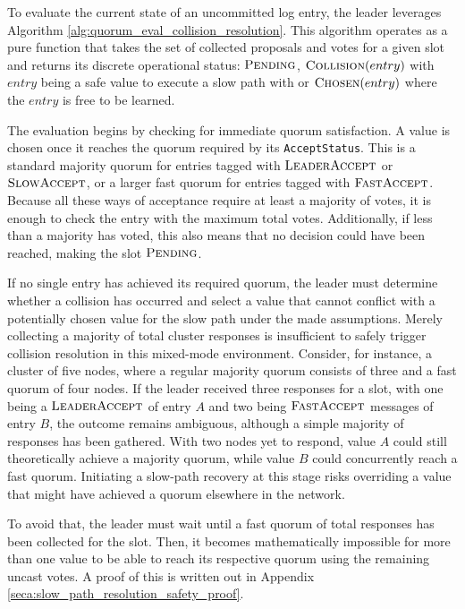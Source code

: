To evaluate the current state of an uncommitted log entry, the leader leverages Algorithm \ref{alg:quorum_eval_collision_resolution}. This algorithm operates as a pure function that takes the set of collected proposals and votes for a given slot and returns its discrete operational status: $\textsc{Pending}$, $\textsc{Collision}(entry)$ with $entry$ being a safe value to execute a slow path with or $\textsc{Chosen}(entry)$ where the $entry$ is free to be learned.

The evaluation begins by checking for immediate quorum satisfaction. A value is chosen once it reaches the quorum required by its \texttt{AcceptStatus}. This is a standard majority quorum for entries tagged with $\textsc{LeaderAccept}$ or $\textsc{SlowAccept}$, or a larger fast quorum for entries tagged with $\textsc{FastAccept}$. Because all these ways of acceptance require at least a majority of votes, it is enough to check the entry with the maximum total votes. Additionally, if less than a majority has voted, this also means that no decision could have been reached, making the slot $\textsc{Pending}$.

If no single entry has achieved its required quorum, the leader must determine whether a collision has occurred and select a value that cannot conflict with a potentially chosen value for the slow path under the made assumptions. Merely collecting a majority of total cluster responses is insufficient to safely trigger collision resolution in this mixed-mode environment. Consider, for instance, a cluster of five nodes, where a regular majority quorum consists of three and a fast quorum of four nodes. If the leader received three responses for a slot, with one being a $\textsc{LeaderAccept}$ of entry $A$ and two being $\textsc{FastAccept}$ messages of entry $B$, the outcome remains ambiguous, although a simple majority of responses has been gathered. With two nodes yet to respond, value $A$ could still theoretically achieve a majority quorum, while value $B$ could concurrently reach a fast quorum. Initiating a slow-path recovery at this stage risks overriding a value that might have achieved a quorum elsewhere in the network.

To avoid that, the leader must wait until a fast quorum of total responses has been collected for the slot. Then, it becomes mathematically impossible for more than one value to be able to reach its respective quorum using the remaining uncast votes. A proof of this is written out in Appendix \ref{seca:slow_path_resolution_safety_proof}.

